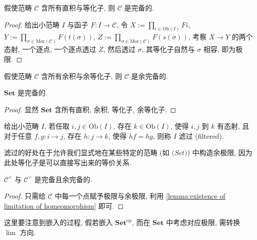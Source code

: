 \begin{theorem}
    假使范畴 \(\mathcal{C}\) 含所有直积与等化子, 则 \(\mathcal{C}\) 是完备的.

    \begin{proof}
        给出小范畴 \(I\) 与函子 \(F : I \to \mathcal{C}\), 令 \(X := \prod_{i \in \mathrm{Ob} (I)} F i\),
        \(Y := \prod_{\sigma \in \mathrm{Mor} (\mathcal{C})} F (t (\sigma))\), \(Z := \prod_{\sigma \in \mathrm{Mor} (\mathcal{C})} F (s (\sigma))\),
        考察 \(X \to Y\) 的两个态射, 一个逐点, 一个逐点透过 \(Z\), 然后透过 \(\sigma\), 其等化子自然与 \(\sigma\) 相容, 即为极限.
    \end{proof}
\end{theorem}

\begin{corollary}
    假使范畴 \(\mathcal{C}\) 含所有余积与余等化子, 则 \(\mathcal{C}\) 是余完备的.
\end{corollary}

\begin{lemma}
    \(\mathbf{Set}\) 是完备的.

    \begin{proof}
        显然 \(\mathbf{Set}\) 含所有直积, 余积, 等化子, 余等化子.
    \end{proof}
\end{lemma}

\begin{definition}[滤过]
    \label {definition:filtered category}
    给出小范畴 \(I\), 若任取 \(i,j \in \mathrm{Ob} (I)\), 存在 \(k \in \mathrm{Ob} (I)\), 使得 \(i,j\) 到 \(k\) 有态射,
    且对于任意 \(f,g : i \to j\), 存在 \(h : j \to k\), 使得 \(h f = h g\), 则称 \(I\) 滤过 (filtered).
\end{definition}

滤过的好处在于允许我们显式地在某些特定的范畴 (如 \(\mathbf(Set)\)) 中构造余极限, 因为此处等化子是可以直接写出来的等价关系.

\begin{lemma}
    \(\mathcal{C}^{\wedge}\) 与 \(\mathcal{C}^{\vee}\) 是完备且余完备的.

    \begin{proof}
        只需给 \(\mathcal{C}\) 中每一个点赋予极限与余极限, 利用 \ref {lemma:existence of limitation of homeomorphism} 即可.
    \end{proof}
\end{lemma}

这里要注意到嵌入的过程, 假若嵌入 \(\mathbf{Set}^\mathrm{op}\), 而在 \(\mathbf{Set}\) 中考虑对应极限, 需转换 \(\lim\) 方向.

